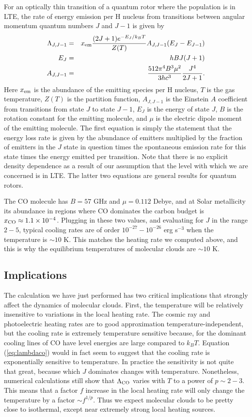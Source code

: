 For an optically thin transition of a quantum rotor where the population is in LTE, the rate of energy emission per H nucleus from transitions between angular momentum quantum numbers $J$ and $J-1$ is given by
\begin{eqnarray}
\label{eq:lambdaco}
\Lambda_{J,J-1} & = & x_{\rm em} \frac{(2J+1)e^{-E_J/k_B T}}{Z(T)} A_{J,J-1} (E_J - E_{J-1}) \\
E_J & = & h B J (J+1) \\
A_{J,J-1} & = & \frac{512\pi^4 B^3\mu^2}{3hc^3} \frac{J^4}{2J+1}.
\end{eqnarray}
Here $x_{\rm em}$ is the abundance of the emitting species per H nucleus, $T$ is the gas temperature, $Z(T)$ is the partition function, $A_{J,J-1}$ is the Einstein $A$ coefficient from transitions from state $J$ to state $J-1$, $E_J$ is the energy of state $J$, $B$ is the rotation constant for the emitting molecule, and $\mu$ is the electric dipole moment of the emitting molecule. The first equation is simply the statement that the energy loss rate is given by the abundance of emitters multiplied by the fraction of emitters in the $J$ state in question times the spontaneous emission rate for this state times the energy emitted per transition. Note that there is no explicit density dependence as a result of our assumption that the level with which we are concerned is in LTE. The latter two equations are general results for quantum rotors.

The CO molecule has $B=57$ GHz and $\mu=0.112$ Debye, and at Solar metallicity its abundance in regions where CO dominates the carbon budget is $x_{\rm CO} \approx 1.1\times 10^{-4}$. Plugging in these two values, and evaluating for $J$ in the range $2-5$, typical cooling rates are of order $10^{-27}-10^{-26}$ erg s$^{-3}$ when the temperature is $\sim 10$ K. This matches the heating rate we computed above, and this is why the equilibrium temperatures of molecular clouds are $\sim 10$ K.

\subsection{Implications}

The calculation we have just performed has two critical implications that strongly affect the dynamics of molecular clouds. First, the temperature will be relatively insensitive to variations in the local heating rate. The cosmic ray and photoelectric heating rates are to good approximation temperature-independent, but the cooling rate is extremely temperature sensitive because, for the dominant cooling lines of CO have level energies are large compared to $k_B T$. Equation (\ref{eq:lambdaco}) would in fact seem to suggest that the cooling rate is exponentially sensitive to temperature. In practice the sensitivity is not quite that great, because which $J$ dominates changes with temperature. Nonetheless, numerical calculations still show that $\Lambda_{\rm CO}$ varies with $T$ to a power of $p \sim 2-3$. This means that a factor $f$ increase in the local heating rate will only change the temperature by a factor $\sim f^{1/p}$. Thus we expect molecular clouds to be pretty close to isothermal, except near extremely strong local heating sources.

